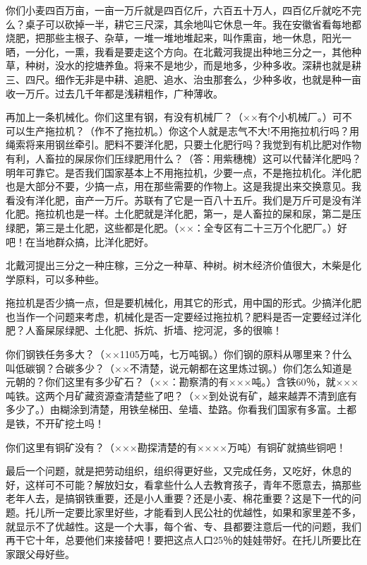 你们小麦四百万亩，一亩一万斤就是四百亿斤，六百五十万人，四百亿斤就吃不完么？桌子可以砍掉一半，耕它三尺深，其余地叫它休息一年。我在安徽省看每地都烧肥，把那些主根子、杂草，一堆一堆地堆起来，叫作熏亩，地一休息，阳光一晒，一分化，一熏，我看是要走这个方向。在北戴河我提出种地三分之一，其他种草，种树，没水的挖塘养鱼。将来不是地少，而是地多，少种多收。深耕也就是耕三、四尺。细作无非是中耕、追肥、追水、治虫那套么，少种多收，也就是种一亩收一万斤。过去几千年都是浅耕粗作，广种薄收。

再加上一条机械化。你们这里有钢，有没有机械厂？（××有个小机械厂。）可不可以生产拖拉机？（作不了拖拉机。）你这个人就是志气不大!不用拖拉机行吗？用绳索将来用钢丝牵引。肥料不要洋化肥，只要土化肥行吗？我觉到有机比肥对作物有利，人畜拉的屎尿你们压绿肥用什么？（答：用紫穗槐）这可以代替洋化肥吗？明年可靠它。是否我们国家基本上不用拖拉机，少要一点，不是拖拉机化。洋化肥也是大部分不要，少搞一点，用在那些需要的作物上。这是我提出来交换意见。我看没有洋化肥，亩产一万斤。苏联有了它是一百八十五斤。我们是万斤可是没有洋化肥。拖拉机也是一样。土化肥就是洋化肥，第一，是人畜拉的屎和尿，第二是压绿肥，第三是土化肥，这些都是化肥。（××：全专区有二十三万个化肥厂。）好吧！在当地群众搞，比洋化肥好。

北戴河提出三分之一种庄稼，三分之一种草、种树。树木经济价值很大，木柴是化学原料，可以多种些。

拖拉机是否少搞一点，但是要机械化，用其它的形式，用中国的形式。少搞洋化肥也当作一个问题来考虑，机械化是否一定要经过拖拉机？肥料是否一定要经过洋化肥？人畜屎尿绿肥、土化肥、拆炕、折墙、挖河泥，多的很嘛！

你们钢铁任务多大？（××1105万吨，七万吨钢。）你们钢的原料从哪里来？什么叫低碳钢？合碳多少？（××不清楚，说元朝都在这里炼过钢。）你们怎么知道是元朝的？你们这里有多少矿石？（××：勘察清的有×××吨。）含铁60％，就×××吨铁。这两个月矿藏资源查清楚些了吧？（××到处说有矿，越来越弄不清到底有多少了。）由糊涂到清楚，用铁垒梯田、垒墙、垫路。你看我们国家有多富。土都是铁，不开矿挖土吗！

你们这里有铜矿没有？（×××勘探清楚的有××××万吨）有铜矿就搞些铜吧！

最后一个问题，就是把劳动组织，组织得更好些，又完成任务，又吃好，休息的好，这样可不可能？解放妇女，看拿些什么人去教育孩子，青年不愿意去，搞那些老年人去，是搞钢铁重要，还是小人重要？还是小麦、棉花重要？这是下一代的问题。托儿所一定要比家里好些，才能看到人民公社的优越性，如果和家里差不多，就显示不了优越性。这是一个大事，每个省、专、县都要注意后一代的问题，我们再干它十年，总要他们来接替吧！要把这点人口25％的娃娃带好。在托儿所要比在家跟父母好些。

